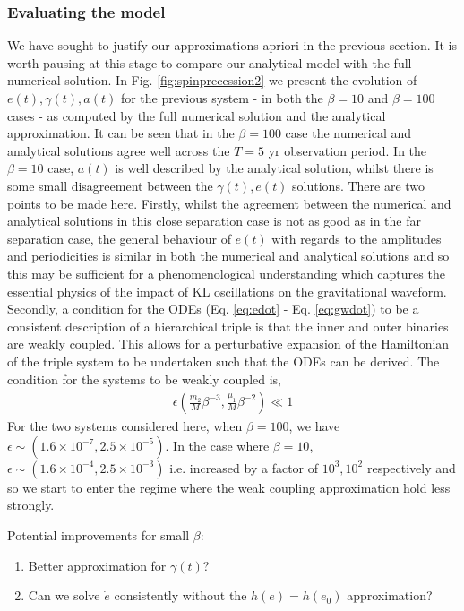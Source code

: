 \documentclass[a4paper,fleqn,usenatbib]{mnras}
\begin{document}
\subsubsection{Evaluating the model}
We have sought to justify our approximations apriori in the previous section. It is worth pausing at this stage to compare our analytical model with the full numerical solution. In Fig. \ref{fig:spinprecession2} we present the evolution of $e(t), \gamma(t), a(t)$ for the previous system - in both the $\beta = 10$ and $\beta = 100$ cases - as computed by the full numerical solution and the analytical approximation. It can be seen that in the $\beta = 100$ case the numerical and analytical solutions agree well across the $T = 5$ yr observation period.  In the $\beta = 10$ case, $a(t)$ is well described by the analytical solution, whilst there is some small disagreement between the $\gamma(t), e(t)$ solutions. There are two points to be made here. Firstly, whilst the agreement between the numerical and analytical solutions in this close separation case is not as good as in the far separation case, the general behaviour of $e(t)$ with regards to the amplitudes and periodicities is similar in both the numerical and analytical solutions and so this may be sufficient for a phenomenological understanding which captures the essential physics of the impact of KL oscillations on the gravitational waveform. Secondly, a condition for the ODEs (Eq. \ref{eq:edot} - Eq. \ref{eq:gwdot}) to be a consistent description of a hierarchical triple is that the inner and outer binaries are weakly coupled. This allows for a perturbative expansion of the Hamiltonian of the triple system to be undertaken such that the ODEs can be derived. The condition for the systems to be weakly coupled is,
\begin{eqnarray}
\epsilon \left (\frac{m_2}{M} \beta^{-3},  \frac{\mu_1}{M} \beta^{-2} \right) \ll 1
\end{eqnarray}
For the two systems considered here, when $\beta = 100$, we have $\epsilon \sim (1.6 \times 10^{-7}, 2.5 \times 10^{-5})$. In the case where $\beta = 10$,  $\epsilon \sim (1.6 \times 10^{-4}, 2.5 \times 10^{-3})$ i.e. increased by a factor of $10^3, 10^2$ respectively and so we start to enter the regime where the weak coupling approximation hold less strongly.\newline 


\noindent Potential improvements for small $\beta$:
\begin{enumerate}
	\item Better approximation for $\gamma(t)$?
	\item Can we solve $\dot{e}$ consistently without the $h(e) = h(e_0)$ approximation?
\end{enumerate}
\end{document}
